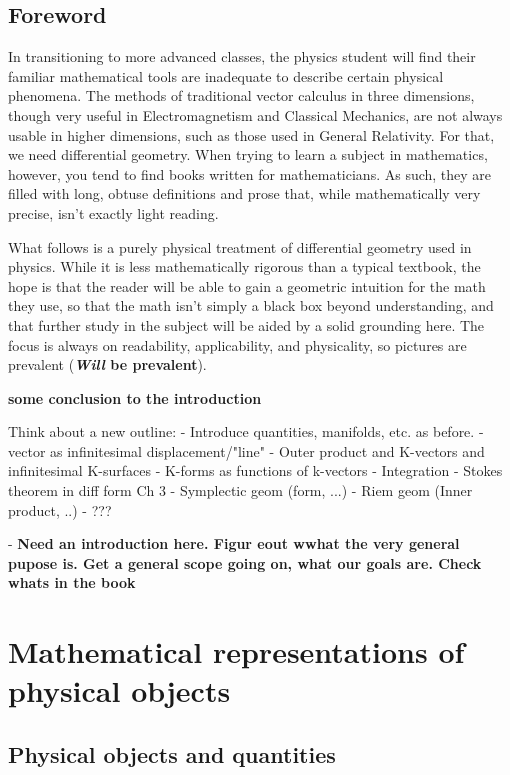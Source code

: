 \documentclass{book}
\begin{document}
\section{Foreword}
In transitioning to more advanced classes, the physics student will find their familiar mathematical tools are inadequate to describe certain physical phenomena. The methods of traditional vector calculus in three dimensions, though very useful in Electromagnetism and Classical Mechanics, are not always usable in higher dimensions, such as those used in General Relativity. For that, we need differential geometry. When trying to learn a subject in mathematics, however, you tend to find books written for mathematicians. As such, they are filled with long, obtuse definitions and prose that, while mathematically very precise, isn't exactly light reading. 

What follows is a purely physical treatment of differential geometry used in physics. While it is less mathematically rigorous than a typical textbook, the hope is that the reader will be able to gain a geometric intuition for the math they use, so that the math isn't simply a black box beyond understanding, and that further study in the subject will be aided by a solid grounding here. The focus is always on readability, applicability, and physicality, so pictures are prevalent (\textbf{\textit{Will} be prevalent}). 

\textbf{some conclusion to the introduction}


\tableofcontents


Think about a new outline: 
- Introduce quantities, manifolds, etc. as before. 
- vector as infinitesimal displacement/"line"
- Outer product and K-vectors and infinitesimal K-surfaces
- K-forms as functions of k-vectors
- Integration
- Stokes theorem in diff form
Ch 3
- Symplectic geom (form, ...)
- Riem geom (Inner product, ..)
- ???

- \textbf{Need an introduction here. Figur eout wwhat the very general pupose is. Get a general scope going on, what our goals are. Check whats in the book}

\chapter{Mathematical representations of physical objects}



\section{Physical objects and quantities}
\end{document}
